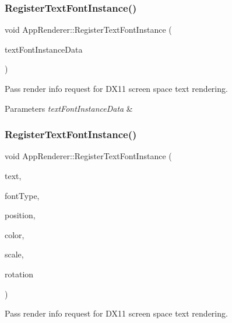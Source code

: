 \subsubsection{\texorpdfstring{Register\+Text\+Font\+Instance()}{RegisterTextFontInstance()}\hspace{0.1cm}{\footnotesize\ttfamily [1/3]}}
{\footnotesize\ttfamily void App\+Renderer\+::\+Register\+Text\+Font\+Instance (\begin{DoxyParamCaption}\item[{const \hyperlink{structTextFontInstanceRenderData}{Text\+Font\+Instance\+Render\+Data} \&}]{text\+Font\+Instance\+Data }\end{DoxyParamCaption})}



Pass render info request for D\+X11 screen space text rendering. 


\begin{DoxyParams}{Parameters}
{\em text\+Font\+Instance\+Data} & \\
\hline
\end{DoxyParams}
\mbox{\label{classAppRenderer_a9d8be5bfc486bd5bf432366784477ecf}} 
\subsubsection{\texorpdfstring{Register\+Text\+Font\+Instance()}{RegisterTextFontInstance()}\hspace{0.1cm}{\footnotesize\ttfamily [2/3]}}
{\footnotesize\ttfamily void App\+Renderer\+::\+Register\+Text\+Font\+Instance (\begin{DoxyParamCaption}\item[{const std\+::string \&}]{text,  }\item[{uint32\+\_\+t}]{font\+Type,  }\item[{const Vector2 \&}]{position,  }\item[{const Vector3 \&}]{color,  }\item[{const Vector3 \&}]{scale,  }\item[{float}]{rotation }\end{DoxyParamCaption})}



Pass render info request for D\+X11 screen space text rendering. 


